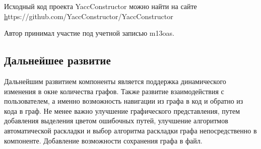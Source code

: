 \documentclass{matmex-diploma}
\begin{document}
Исходный код проекта YaccConstructor можно найти на сайте\\
\href{https://github.com/YaccConstructor/YaccConstructor}https://github.com/YaccConstructor/YaccConstructor

Автор принимал участие под учетной записью m13oas.

\subsection*{Дальнейшее развитие}
Дальнейшим развитием компоненты является поддержка динамического изменения в окне количества графов. Также развитие взаимодействия с пользователем, а именно возможность навигации из графа в код и обратно из кода в граф. Не менее важно улучшение графического представления, путем добавления выделения цветом ошибочных путей, улучшение алгоритмов автоматической раскладки и выбор алгоритма раскладки графа непосредственно в компоненте. Добавление возможности сохранения графа в файл.



\end{document}
